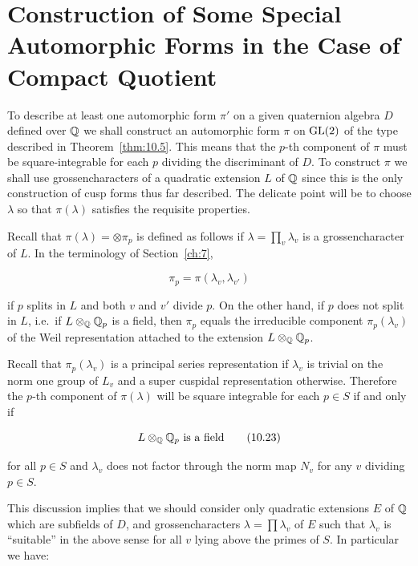 \section{Construction of Some Special Automorphic Forms in the Case of Compact Quotient}\label{sec:10c}

To describe at least one automorphic form $\pi'$ on a given quaternion algebra $D$ defined over $\mathbb{Q}$ we shall construct an automorphic form $\pi$ on $\operatorname{GL}(2)$ of the type described in Theorem~\ref{thm:10.5}. This means that the $p$-th component of $\pi$ must be square-integrable for each $p$ dividing the discriminant of $D$. To construct $\pi$ we shall use grossencharacters of a quadratic extension $L$ of $\mathbb{Q}$ since this is the only construction of cusp forms thus far described. The delicate point will be to choose $\lambda$ so that $\pi(\lambda)$ satisfies the requisite properties.

Recall that $\pi(\lambda) = \otimes \pi_p$ is defined as follows if $\lambda = \prod_v \lambda_v$ is a grossencharacter of $L$. In the terminology of Section~\ref{ch:7},

\[
\pi_p = \pi(\lambda_v, \lambda_{v'})
\]

if $p$ splits in $L$ and both $v$ and $v'$ divide $p$. On the other hand, if $p$ does not split in $L$, i.e.\ if $L \otimes_{\mathbb{Q}} \mathbb{Q}_p$ is a field, then $\pi_p$ equals the irreducible component $\pi_p(\lambda_v)$ of the Weil representation attached to the extension $L \otimes_{\mathbb{Q}} \mathbb{Q}_p$.

Recall that $\pi_p(\lambda_v)$ is a principal series representation if $\lambda_v$ is trivial on the norm one group of $L_v$ and a super cuspidal representation otherwise. Therefore the $p$-th component of $\pi(\lambda)$ will be square integrable for each $p \in S$ if and only if

\begin{equation}\label{eq:10.23}
L \otimes_{\mathbb{Q}} \mathbb{Q}_p \text{ is a field}\tag{10.23}
\end{equation}

for all $p \in S$ and $\lambda_v$ does not factor through the norm map $N_v$ for any $v$ dividing $p \in S$.

This discussion implies that we should consider only quadratic extensions $E$ of $\mathbb{Q}$ which are subfields of $D$, and grossencharacters $\lambda = \prod \lambda_v$ of $E$ such that $\lambda_v$ is ``suitable'' in the above sense for all $v$ lying above the primes of $S$. In particular we have:

